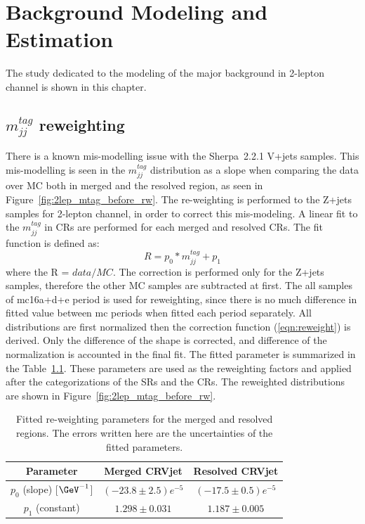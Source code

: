 \chapter{Background Modeling and Estimation}
The study dedicated to the modeling of the major background in 2-lepton channel is shown in this chapter. 

\section{$m_{jj}^{tag}$ reweighting}
There is a known mis-modelling issue with the Sherpa~2.2.1 V+jets samples. This mis-modelling is seen in the $m^{tag}_{jj}$ distribution as a slope when comparing the data over MC both in merged and the resolved region, as seen in Figure~\ref{fig:2lep_mtag_before_rw}.
The re-weighting is performed to the Z+jets samples for 2-lepton channel, in order to correct this mis-modeling. A linear fit to the $m^{tag}_{jj}$ in CRs are performed for each merged and resolved CRs. The fit function is defined as:
\begin{equation}
\label{eqn:reweight}
R=p_{0} * m_{jj}^{tag}+p_{1}
\end{equation}
where the R = $data/MC$. The correction is performed only for the Z+jets samples, therefore the other MC samples are subtracted at first. The all samples of mc16a+d+e period is used for reweighting, since there is no much difference in fitted value between mc periods when fitted each period separately. All distributions are first normalized then the correction function (\ref{eqn:reweight}) is derived. Only the difference of the shape is corrected, and difference of the normalization is accounted in the final fit.
The fitted parameter is summarized in the Table~\ref{tab:fit}. These parameters are used as the reweighting factors and applied after the categorizations of the SRs and the CRs. The reweighted distributions are shown in Figure~\ref{fig:2lep_mtag_before_rw}.

\begin{table}[htbp]
 \footnotesize
\begin{center}
\begin{tabular}{ | c | c | c |}
\hline
Parameter & Merged CRVjet & Resolved CRVjet  \\
\hline
$p_{0}$ (slope) [$\GeV^{-1}$] & $(-23.8 \pm 2.5)e^{-5}$ &  $(-17.5 \pm 0.5)e^{-5}$ \\
 \hline
$p_{1}$ (constant)  & $1.298 \pm 0.031$ & $1.187 \pm 0.005$ \\
\hline
\end{tabular}
\caption{\label{tab:fit} Fitted re-weighting parameters for the merged and resolved regions. The errors written here are the uncertainties of the fitted parameters. }
  \end{center}
\end{table}



